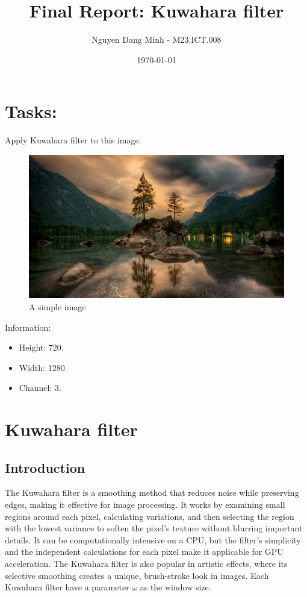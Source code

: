 \documentclass{article}
\title{Final Report: Kuwahara filter}
\author{Nguyen Dang Minh - M23.ICT.008}
\date{\today}
\begin{document}
\maketitle
\section{Tasks:}

Apply Kuwahara filter to this image.

\begin{figure}[H]
    \centering
    \includegraphics[width=1\linewidth]{Kuwa.jpg}
    \caption{A simple image}
\end{figure} 
Information: 
\begin{itemize}
    \item Height: 720.
    \item Width: 1280.
    \item Channel: 3.
\end{itemize}


\section{Kuwahara filter}
\subsection{Introduction}
The Kuwahara filter is a smoothing method that reduces noise while preserving edges, making it effective for image processing. 
It works by examining small regions around each pixel, calculating variations, and then selecting the region with the lowest variance to soften the pixel’s texture without blurring important details. 
It can be computationally intensive on a CPU, but the filter's simplicity and the independent calculations for each pixel make it applicable for GPU acceleration. 
The Kuwahara filter is also popular in artistic effects, where its selective smoothing creates a unique, brush-stroke look in images. 
Each Kuwahara filter have a parameter $\omega$ as the window size.
\end{document}
